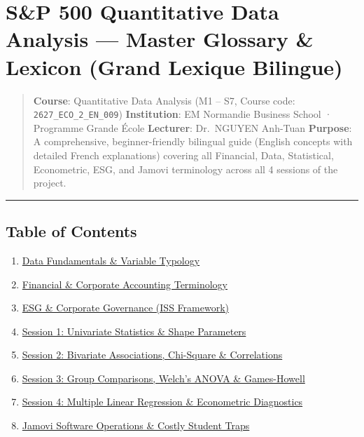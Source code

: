 \documentclass[
]{article}
\author{}
\date{}
\providecommand{\tightlist}{%
  \setlength{\itemsep}{0pt}\setlength{\parskip}{0pt}}
\begin{document}
\section{S\&P 500 Quantitative Data Analysis --- Master Glossary \&
Lexicon (Grand Lexique
Bilingue)}\label{sp-500-quantitative-data-analysis-master-glossary-lexicon-grand-lexique-bilingue}

\begin{quote}
\textbf{Course}: Quantitative Data Analysis (M1 -- S7, Course code:
\texttt{2627\_ECO\_2\_EN\_009}) \textbf{Institution}: EM Normandie
Business School · Programme Grande École \textbf{Lecturer}: Dr.~NGUYEN
Anh-Tuan \textbf{Purpose}: A comprehensive, beginner-friendly bilingual
guide (English concepts with detailed French explanations) covering all
Financial, Data, Statistical, Econometric, ESG, and Jamovi terminology
across all 4 sessions of the project.
\end{quote}

\begin{center}\rule{0.5\linewidth}{0.5pt}\end{center}

\subsection{Table of Contents}\label{table-of-contents}

\begin{enumerate}
\def\labelenumi{\arabic{enumi}.}
\tightlist
\item
  \hyperref[1-data-fundamentals--variable-typology]{Data Fundamentals \&
  Variable Typology}
\item
  \hyperref[2-financial--corporate-accounting-terminology]{Financial \&
  Corporate Accounting Terminology}
\item
  \hyperref[3-esg--corporate-governance-iss-framework]{ESG \& Corporate
  Governance (ISS Framework)}
\item
  \hyperref[4-session-1-univariate-statistics--shape-parameters]{Session
  1: Univariate Statistics \& Shape Parameters}
\item
  \hyperref[5-session-2-bivariate-associations-chi-square--correlations]{Session
  2: Bivariate Associations, Chi-Square \& Correlations}
\item
  \hyperref[6-session-3-group-comparisons-welchs-anova--games-howell]{Session
  3: Group Comparisons, Welch's ANOVA \& Games-Howell}
\item
  \hyperref[7-session-4-multiple-linear-regression--econometric-diagnostics]{Session
  4: Multiple Linear Regression \& Econometric Diagnostics}
\item
  \hyperref[8-jamovi-software-operations--costly-student-traps]{Jamovi
  Software Operations \& Costly Student Traps}
\end{enumerate}
\end{document}
